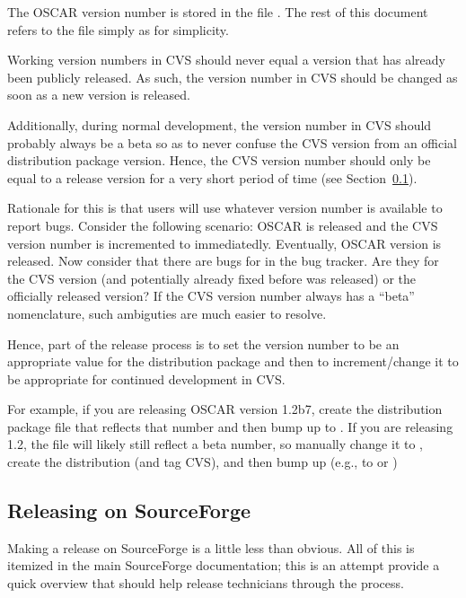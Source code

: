 The OSCAR version number is stored in the file .
The rest of this document refers to the file simply as 
for simplicity.

Working version numbers in CVS should never equal a version that has
already been publicly released.  As such, the version number in CVS
should be changed as soon as a new version is released.

Additionally, during normal development, the version number in CVS
should probably always be a beta so as to never confuse the CVS
version from an official distribution package version.  Hence, the CVS
version number should only be equal to a release version for a very
short period of time (see Section~\ref{sec:release-sf}).

Rationale for this is that users will use whatever version number is
available to report bugs.  Consider the following scenario: OSCAR
 is released and the CVS version number is incremented to
 immediatedly.  Eventually, OSCAR version
 is released.  Now consider that there are bugs for
 in the bug tracker.  Are they for the CVS version
(and potentially already fixed before  was released)
or the officially released version?  If the CVS version number always
has a ``beta'' nomenclature, such ambiguties are much easier to
resolve.

Hence, part of the release process is to set the version number to be
an appropriate value for the distribution package and then to
increment/change it to be appropriate for continued development in
CVS.
    
For example, if you are releasing OSCAR version 1.2b7, create the
distribution package file that reflects that number and then bump up
 to .  If you are releasing 1.2, the
 file will likely still reflect a beta number, so
manually change it to , create the distribution (and tag
CVS), and then bump up  (e.g., to  or
)
    

\subsection{Releasing on SourceForge}
\label{sec:release-sf}

Making a release on SourceForge is a little less than obvious.  All of
this is itemized in the main SourceForge documentation; this is an
attempt provide a quick overview that should help release technicians
through the process.

